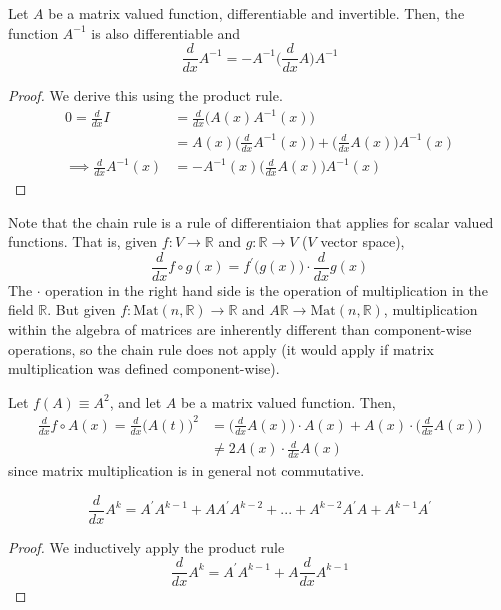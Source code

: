 \documentclass{article}
\begin{document}
    \begin{theorem}
    Let $A$ be a matrix valued function, differentiable and invertible. Then, the function $A^{-1}$ is also differentiable and 
    \[\frac{d}{d x} A^{-1} = - A^{-1} \bigg( \frac{d}{d x} A \bigg) A^{-1}\]
    \end{theorem}
    \begin{proof}
    We derive this using the product rule. 
    \begin{align*}
        0 = \frac{d}{d x} I & = \frac{d}{d x} \big( A(x) A^{-1} (x) \big) \\
        & = A(x) \bigg(\frac{d}{d x} A^{-1} (x) \bigg) + \bigg( \frac{d}{d x} A(x) \bigg) A^{-1} (x) \\
        \implies \frac{d}{d x} A^{-1} (x) & = - A^{-1} (x) \bigg( \frac{d}{d x} A(x) \bigg) A^{-1}(x)
    \end{align*}
    \end{proof}
    Note that the chain rule is a rule of differentiaion that applies for scalar valued functions. That is, given $f: V \longrightarrow \mathbb{R}$ and $g: \mathbb{R} \longrightarrow V$ ($V$ vector space), 
    \[\frac{d}{d x} f \circ g (x) = f^\prime \big( g(x) \big) \cdot \frac{d}{d x} g(x)\]
    The $\cdot$ operation in the right hand side is the operation of multiplication in the field $\mathbb{R}$. But given $f: \text{Mat}(n, \mathbb{R}) \longrightarrow \mathbb{R}$ and $A \mathbb{R} \longrightarrow \text{Mat}(n, \mathbb{R})$, multiplication within the algebra of matrices are inherently different than component-wise operations, so the chain rule does not apply (it would apply if matrix multiplication was defined component-wise). 

    \begin{example}
    Let $f(A) \equiv A^2$, and let $A$ be a matrix valued function. Then, 
    \begin{align*}
        \frac{d}{d x} f \circ A(x) = \frac{d}{d x} \big( A(t) \big)^2 & = \bigg( \frac{d}{d x} A(x) \bigg) \cdot A(x) + A(x) \cdot \bigg( \frac{d}{d x} A(x) \bigg) \\
        & \neq 2 A(x) \cdot \frac{d}{d x} A(x)
    \end{align*}
    since matrix multiplication is in general not commutative. 
    \end{example}

    \begin{proposition}
    \[\frac{d}{d x} A^k = A^\prime A^{k-1} + A A^\prime A^{k-2} + ... + A^{k-2} A^\prime A + A^{k-1} A^\prime\]
    \end{proposition}
    \begin{proof}
    We inductively apply the product rule
    \[\frac{d}{d x} A^k = A^\prime A^{k-1} + A \frac{d}{d x} A^{k-1}\]
    \end{proof}
\end{document}
